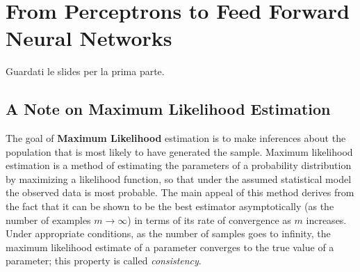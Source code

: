 \section{From Perceptrons to Feed Forward Neural Networks}
Guardati le slides per la prima parte.

\subsection{A Note on Maximum Likelihood Estimation}
The goal of \textbf{Maximum Likelihood} estimation is to make inferences about the population that is most likely to have generated the sample.
Maximum likelihood estimation is a method of estimating the parameters of a probability distribution by maximizing a likelihood function, so that under the assumed statistical model the observed data is most probable. The main appeal of this method derives from the fact that it can be shown to be the best estimator asymptotically (as the number of examples $m \to \infty$) in terms of its rate of convergence as $m$ increases. Under appropriate conditions, as the number of samples goes to infinity, the maximum likelihood estimate of a parameter converges to the true value of a parameter; this property is called \textit{consistency}. 

